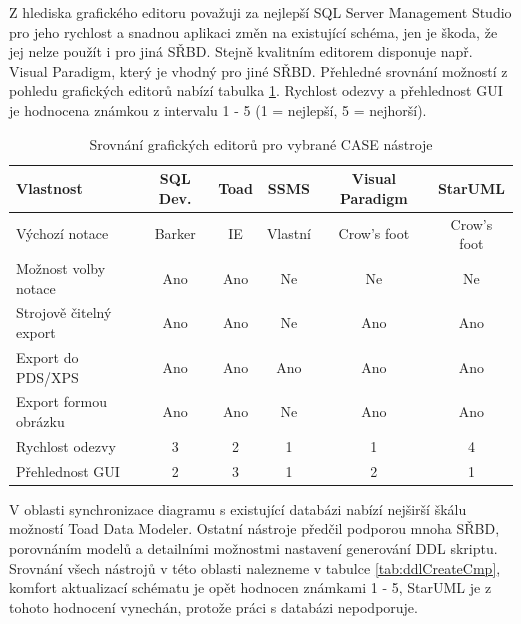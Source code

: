 \documentclass[czech,bachelor,public,dept460,male,oneside]{diploma}
\begin{document}
	Z hlediska grafického editoru považuji za nejlepší SQL Server Management Studio pro jeho rychlost a snadnou aplikaci změn na existující schéma, jen je škoda, že jej nelze použít i pro jiná SŘBD. Stejně kvalitním editorem disponuje např. Visual Paradigm, který je vhodný pro jiné SŘBD. Přehledné srovnání možností z pohledu grafických editorů nabízí tabulka \ref{tab:geditCmp}. Rychlost odezvy a přehlednost GUI je hodnocena známkou z intervalu 1 - 5 (1 = nejlepší, 5 = nejhorší).
	
	\begin{table}[h!]
		\centering
		\caption{Srovnání grafických editorů pro vybrané CASE nástroje}
		\label{tab:geditCmp}
		\begin{tabular}{l c c c c c}
			\toprule
			Vlastnost & SQL Dev. & Toad & SSMS & Visual Paradigm & StarUML \\
			\midrule
			Výchozí notace & Barker & IE & Vlastní & Crow's foot & Crow's foot \\
			Možnost volby notace & Ano & Ano & Ne & Ne & Ne \\
			Strojově čitelný export & Ano & Ano & Ne & Ano & Ano \\
			Export do PDS/XPS & Ano & Ano & Ano & Ano & Ano \\
			Export formou obrázku & Ano & Ano & Ne & Ano & Ano \\
			Rychlost odezvy & 3 & 2 & 1 & 1 & 4 \\
			Přehlednost GUI & 2 & 3 & 1 & 2 & 1 \\
			\midrule
		\end{tabular}
	\end{table}
	
	\newpage
	V oblasti synchronizace diagramu s existující databázi nabízí nejširší škálu možností Toad Data Modeler. Ostatní nástroje předčil podporou mnoha SŘBD, porovnáním modelů a detailními možnostmi nastavení generování DDL skriptu. Srovnání všech nástrojů v této oblasti nalezneme v tabulce \ref{tab:ddlCreateCmp}, komfort aktualizací schématu je opět hodnocen známkami 1 - 5, StarUML je z tohoto hodnocení vynechán, protože práci s databázi nepodporuje.
	
\end{document}
